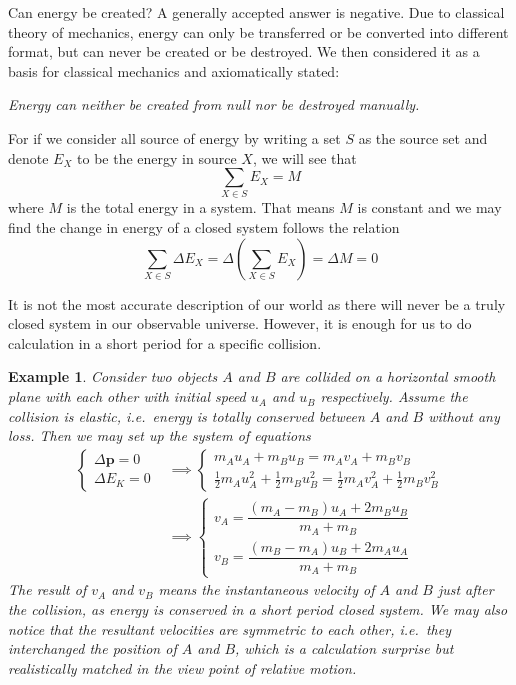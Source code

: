 \documentclass[12pt]{article}
\newtheorem*{example}{Example}
\begin{document}
    Can energy be created? A generally accepted answer is negative. Due to classical theory of mechanics, energy can only be transferred or be converted into different format, but can never be created or be destroyed. We then considered it as a basis for classical mechanics and axiomatically stated:

    \begin{center}
        \textit{Energy can neither be created from null nor be destroyed manually.}
    \end{center}

    For if we consider all source of energy by writing a set $S$ as the source set and denote $E_X$ to be the energy in source $X$, we will see that \[\sum_{X\in S}E_X = M\] where $M$ is the total energy in a system. That means $M$ is constant and we may find the change in energy of a closed system follows the relation \[\sum_{X\in S} \Delta E_X = \Delta (\sum_{X\in S} E_X) = \Delta M = 0\]

    It is not the most accurate description of our world as there will never be a truly closed system in our observable universe. However, it is enough for us to do calculation in a short period for a specific collision.

    \begin{example}
        Consider two objects $A$ and $B$ are collided on a horizontal smooth plane with each other with initial speed $u_A$ and $u_B$ respectively. Assume the collision is elastic, i.e.\ energy is totally conserved between $A$ and $B$ without any loss. Then we may set up the system of equations \begin{align*}
            \begin{cases}
                \Delta \mathbf{p} = 0\\
                \Delta E_K = 0
            \end{cases}&\implies \begin{cases}
                m_A u_A + m_B u_B = m_A v_A + m_B v_B\\
                \frac{1}{2}m_A u_A^2+\frac{1}{2}m_B u_B^2=\frac{1}{2}m_A v_A^2+\frac{1}{2}m_B v_B^2
            \end{cases}\\
            &\implies \begin{cases}
                v_A=\dfrac{(m_A-m_B)u_A+2m_B u_B}{m_A+m_B}\\
                v_B=\dfrac{(m_B-m_A)u_B+2m_A u_A}{m_A+m_B}
            \end{cases}
        \end{align*}
        The result of $v_A$ and $v_B$ means the instantaneous velocity of $A$ and $B$ just after the collision, as energy is conserved in a short period closed system. We may also notice that the resultant velocities are symmetric to each other, i.e.\ they interchanged the position of $A$ and $B$, which is a calculation surprise but realistically matched in the view point of relative motion.
    \end{example}
\end{document}

